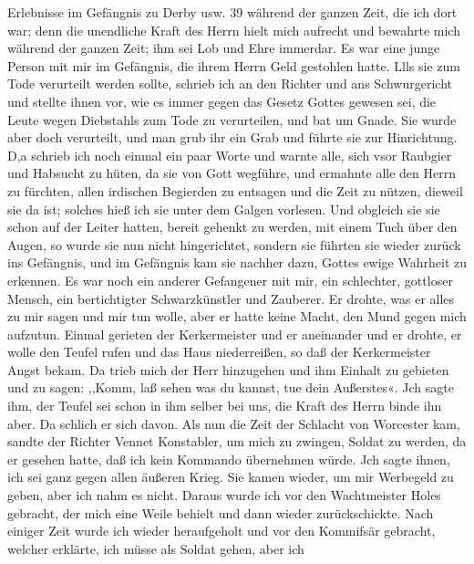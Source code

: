 Erlebnisse im Gefängnis zu Derby usw. 39
während der ganzen Zeit, die ich dort war; denn die unendliche
Kraft des Herrn hielt mich aufrecht und bewahrte mich während
der ganzen Zeit; ihm sei Lob und Ehre immerdar.
Es war eine junge Person mit mir im Gefängnis, die ihrem
Herrn Geld gestohlen hatte. Llls sie zum Tode verurteilt werden
sollte, schrieb ich an den Richter und ans Schwurgericht und
stellte ihnen vor, wie es immer gegen das Gesetz Gottes gewesen
sei, die Leute wegen Diebstahls zum Tode zu verurteilen, und
bat um Gnade. Sie wurde aber doch verurteilt, und man grub
ihr ein Grab und führte sie zur Hinrichtung. D,a schrieb ich noch
einmal ein paar Worte und warnte alle, sich vsor Raubgier und
Habsucht zu hüten, da sie von Gott wegführe, und ermahnte alle
den Herrn zu fürchten, allen irdischen Begierden zu entsagen und
die Zeit zu nützen, dieweil sie da ist; solches hieß ich sie unter
dem Galgen vorlesen. Und obgleich sie sie schon auf der Leiter
hatten, bereit gehenkt zu werden, mit einem Tuch über den Augen,
so wurde sie nun nicht hingerichtet, sondern sie führten sie wieder
zurück ins Gefängnis, und im Gefängnis kam sie nachher dazu,
Gottes ewige Wahrheit zu erkennen.
Es war noch ein anderer Gefangener mit mir, ein schlechter,
gottloser Mensch, ein bertichtigter Schwarzkünstler und Zauberer.
Er drohte, was er alles zu mir sagen und mir tun wolle, aber
er hatte keine Macht, den Mund gegen mich aufzutun. Einmal
gerieten der Kerkermeister und er aneinander und er drohte, er
wolle den Teufel rufen und das Haus niederreißen, so daß der
Kerkermeister Angst bekam. Da trieb mich der Herr hinzugehen
und ihm Einhalt zu gebieten und zu sagen: ,,Komm, laß sehen
was du kannst, tue dein Außerstes«. Jch sagte ihm, der Teufel
sei schon in ihm selber bei uns, die Kraft des Herrn binde ihn
aber. Da schlich er sich davon.
Als nun die Zeit der Schlacht von Worcester kam, sandte
der Richter Vennet Konstabler, um mich zu zwingen, Soldat zu
werden, da er gesehen hatte, daß ich kein Kommando übernehmen
würde. Jch sagte ihnen, ich sei ganz gegen allen äußeren Krieg.
Sie kamen wieder, um mir Werbegeld zu geben, aber ich nahm
es nicht. Daraus wurde ich vor den Wachtmeister Holes gebracht,
der mich eine Weile behielt und dann wieder zurückschickte. Nach
einiger Zeit wurde ich wieder heraufgeholt und vor den Kommifsär
gebracht, welcher erklärte, ich müsse als Soldat gehen, aber ich

